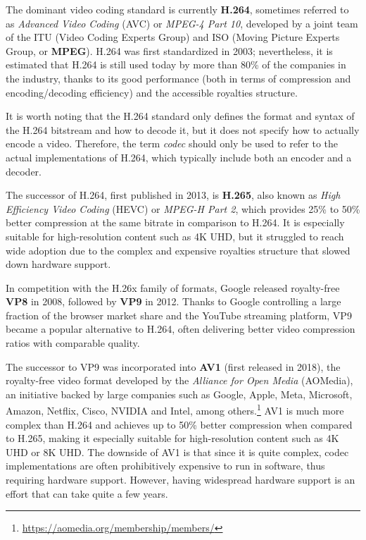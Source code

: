 The dominant video coding standard is currently \textbf{H.264}, sometimes referred to as \textit{Advanced Video Coding} (AVC) or \textit{MPEG-4 Part 10}, developed by a joint team of the ITU (Video Coding Experts Group) and ISO (Moving Picture Experts Group, or \textbf{MPEG}). H.264 was first standardized in 2003; nevertheless, it is estimated that H.264 is still used today by more than 80\% of the companies in the industry, thanks to its good performance (both in terms of compression and encoding/decoding efficiency) and the accessible royalties structure.\cite{bitmovin}

It is worth noting that the H.264 standard only defines the format and syntax of the H.264 bitstream and how to decode it, but it does not specify how to actually encode a video. Therefore, the term \textit{codec} should only be used to refer to the actual implementations of H.264, which typically include both an encoder and a decoder.

The successor of H.264, first published in 2013, is \textbf{H.265}, also known as \textit{High Efficiency Video Coding} (HEVC) or \textit{MPEG-H Part 2}, which provides 25\% to 50\% better compression at the same bitrate in comparison to H.264. It is especially suitable for high-resolution content such as 4K UHD, but it struggled to reach wide adoption due to the complex and expensive royalties structure that slowed down hardware support.\cite{hevcroyalties}

In competition with the H.26x family of formats, Google released royalty-free \textbf{VP8} in 2008, followed by \textbf{VP9} in 2012. Thanks to Google controlling a large fraction of the browser market share and the YouTube streaming platform, VP9 became a popular alternative to H.264, often delivering better video compression ratios with comparable quality.\cite{bitmovin}

The successor to VP9 was incorporated into \textbf{AV1} (first released in 2018), the royalty-free video format developed by the \textit{Alliance for Open Media} (AOMedia), an initiative backed by large companies such as Google, Apple, Meta, Microsoft, Amazon, Netflix, Cisco, NVIDIA and Intel, among others.\footnote{\url{https://aomedia.org/membership/members/}} AV1 is much more complex than H.264 and achieves up to 50\% better compression when compared to H.265, making it especially suitable for high-resolution content such as 4K UHD or 8K UHD. The downside of AV1 is that since it is quite complex, codec implementations are often prohibitively expensive to run in software, thus requiring hardware support. However, having widespread hardware support is an effort that can take quite a few years.\cite{av1}

